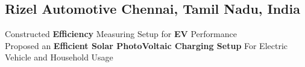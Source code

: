 \documentclass[]{Keval-resume}
\begin{document}
{{%





\sectionsep

\subsection{Rizel Automotive \hfill \normalfont C\lowercase{hennai,} T\lowercase{amil} N\lowercase{adu,} I\lowercase{ndia}}
\hspace{1.5em} \textbullet{} Constructed \textbf{Efficiency} Measuring Setup for \textbf{EV} Performance \\
\hspace{1.5em} \textbullet{} Proposed an  \textbf{Efficient Solar PhotoVoltaic Charging Setup} For Electric Vehicle and Household Usage \\
\sectionsep

}}
\end{document}
